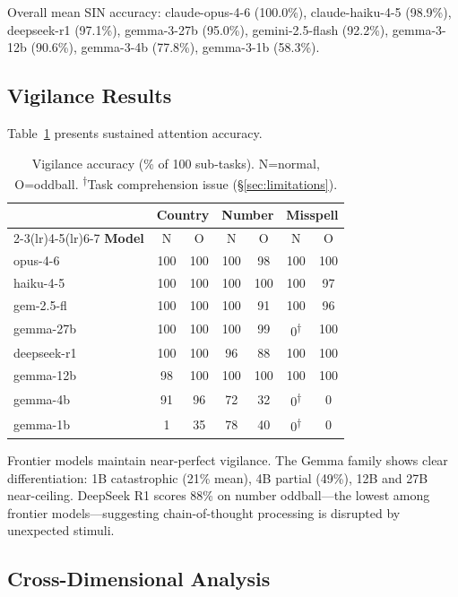 \documentclass[11pt,twocolumn]{article}
\begin{document}
Overall mean SIN accuracy: claude-opus-4-6 (100.0\%), claude-haiku-4-5 (98.9\%), deepseek-r1 (97.1\%), gemma-3-27b (95.0\%), gemini-2.5-flash (92.2\%), gemma-3-12b (90.6\%), gemma-3-4b (77.8\%), gemma-3-1b (58.3\%).

\subsection{Vigilance Results}

Table~\ref{tab:vigilance} presents sustained attention accuracy.

\begin{table}[t]
\centering
\caption{Vigilance accuracy (\% of 100 sub-tasks). N=normal, O=oddball. \textsuperscript{$\dagger$}Task comprehension issue (\S\ref{sec:limitations}).}
\label{tab:vigilance}
\small
\setlength{\tabcolsep}{3pt}
\begin{tabular}{@{}lcccccc@{}}
\toprule
 & \multicolumn{2}{c}{\textbf{Country}} & \multicolumn{2}{c}{\textbf{Number}} & \multicolumn{2}{c}{\textbf{Misspell}} \\
\cmidrule(lr){2-3}\cmidrule(lr){4-5}\cmidrule(lr){6-7}
\textbf{Model} & N & O & N & O & N & O \\
\midrule
opus-4-6    & 100 & 100 & 100 & 98  & 100 & 100 \\
haiku-4-5   & 100 & 100 & 100 & 100 & 100 & 97 \\
gem-2.5-fl  & 100 & 100 & 100 & 91  & 100 & 96 \\
gemma-27b   & 100 & 100 & 100 & 99  & 0\textsuperscript{$\dagger$} & 100 \\
deepseek-r1 & 100 & 100 & 96  & 88  & 100 & 100 \\
gemma-12b   & 98  & 100 & 100 & 100 & 100 & 100 \\
gemma-4b    & 91  & 96  & 72  & 32  & 0\textsuperscript{$\dagger$} & 0 \\
gemma-1b    & 1   & 35  & 78  & 40  & 0\textsuperscript{$\dagger$} & 0 \\
\bottomrule
\end{tabular}
\end{table}

Frontier models maintain near-perfect vigilance. The Gemma family shows clear differentiation: 1B catastrophic (21\% mean), 4B partial (49\%), 12B and 27B near-ceiling. DeepSeek R1 scores 88\% on number oddball---the lowest among frontier models---suggesting chain-of-thought processing is disrupted by unexpected stimuli.

\subsection{Cross-Dimensional Analysis}
\end{document}
